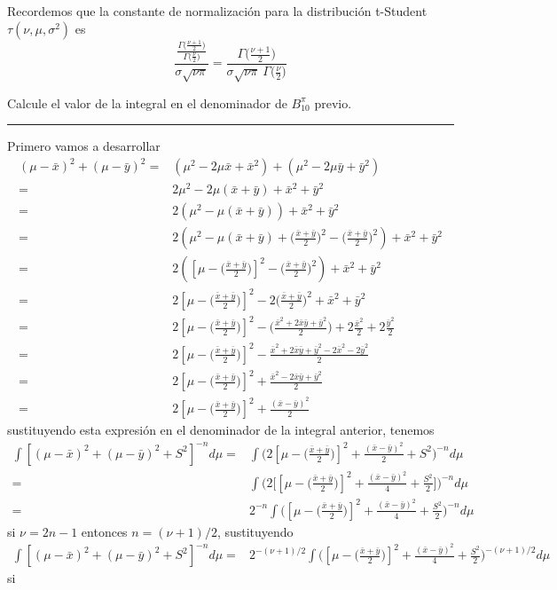 \documentclass[12pt,]{article}
\begin{document}
Recordemos que la constante de normalización para la distribución
t-Student \(\tau(\nu,\mu,\sigma^2)\) es \[
\displaystyle \frac{\frac{\Gamma\bigg(\frac{\nu+1}{2}\bigg)}{\Gamma\big(\frac{\nu}{2}\big)}}{\sigma\sqrt{\nu\pi}}=\displaystyle \frac{\Gamma\bigg(\frac{\nu+1}{2}\bigg)}{\sigma\sqrt{\nu\pi}\ \Gamma\big(\frac{\nu}{2}\big)}
\]

Calcule el valor de la integral en el denominador de \(B_{10}^\pi\)
previo.

\begin{center}\rule{0.5\linewidth}{\linethickness}\end{center}

Primero vamos a desarrollar \[
\begin{array}{rl}
(\mu-\bar{x})^2+(\mu-\bar{y})^2=&(\mu^2-2\mu\bar{x}+\bar{x}^2)+(\mu^2-2\mu\bar{y}+\bar{y}^2)\\
=&2\mu^2-2\mu(\bar{x}+\bar{y})+\bar{x}^2+\bar{y}^2\\
=&2(\mu^2-\mu(\bar{x}+\bar{y}))+\bar{x}^2+\bar{y}^2\\
=&2(\mu^2-\mu(\bar{x}+\bar{y}) + \big(\frac{\bar{x}+\bar{y}}{2}\big)^2-\big(\frac{\bar{x}+\bar{y}}{2}\big)^2)+\bar{x}^2+\bar{y}^2\\
=&2([\mu- \big(\frac{\bar{x}+\bar{y}}{2}\big)]^2-\big(\frac{\bar{x}+\bar{y}}{2}\big)^2)+\bar{x}^2+\bar{y}^2\\
=&2[\mu- \big(\frac{\bar{x}+\bar{y}}{2}\big)]^2-2\big(\frac{\bar{x}+\bar{y}}{2}\big)^2+\bar{x}^2+\bar{y}^2\\
=&2[\mu- \big(\frac{\bar{x}+\bar{y}}{2}\big)]^2-\big(\frac{\bar{x}^2+2\bar{x}\bar{y}+\bar{y}^2}{2}\big)+2\frac{\bar{x}^2}{2}+2\frac{\bar{y}^2}{2}\\
=&2[\mu- \big(\frac{\bar{x}+\bar{y}}{2}\big)]^2-\frac{\bar{x}^2+2\bar{x}\bar{y}+\bar{y}^2-2\bar{x}^2-2\bar{y}^2}{2}\\
=&2[\mu- \big(\frac{\bar{x}+\bar{y}}{2}\big)]^2+\frac{\bar{x}^2-2\bar{x}\bar{y}+\bar{y}^2}{2}\\
=&2[\mu- \big(\frac{\bar{x}+\bar{y}}{2}\big)]^2+\frac{(\bar{x}-\bar{y})^2}{2}
\end{array}
\] sustituyendo esta expresión en el denominador de la integral
anterior, tenemos \[
\begin{array}{rl}
\displaystyle \int[(\mu-\bar{x})^2+(\mu-\bar{y})^2+S^2]^{-n}d\mu=&\displaystyle \int \Bigg(2[\mu- \big(\frac{\bar{x}+\bar{y}}{2}\big)]^2+\frac{(\bar{x}-\bar{y})^2}{2}+S^2\Bigg)^{-n}d\mu\\
=&\displaystyle \int\bigg(2\bigg[ [\mu- \big(\frac{\bar{x}+\bar{y}}{2}\big)]^2+\frac{(\bar{x}-\bar{y})^2}{4}+\frac{S^2}{2} \bigg]\bigg)^{-n}d\mu\\
=&2^{-n}\displaystyle \int\bigg( [\mu- \big(\frac{\bar{x}+\bar{y}}{2}\big)]^2+\frac{(\bar{x}-\bar{y})^2}{4}+\frac{S^2}{2}\bigg)^{-n}d\mu
\end{array}
\] si \(\nu=2n-1\) entonces \(n=(\nu+1)/2\), sustituyendo \[
\begin{array}{rl}
\displaystyle \int[(\mu-\bar{x})^2+(\mu-\bar{y})^2+S^2]^{-n}d\mu=&2^{-(\nu+1)/2}\displaystyle \int\bigg( [\mu- \big(\frac{\bar{x}+\bar{y}}{2}\big)]^2+\frac{(\bar{x}-\bar{y})^2}{4}+\frac{S^2}{2}\bigg)^{-(\nu+1)/2}d\mu
\end{array}
\] si
\end{document}
